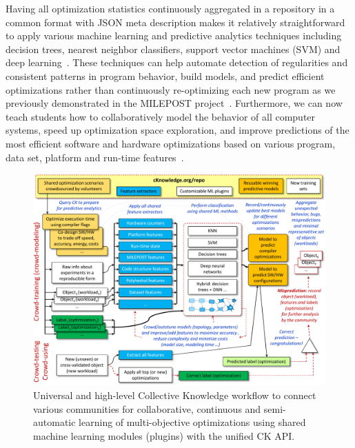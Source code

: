 Having all optimization statistics continuously aggregated in a repository 
in a common format with JSON meta description 
makes it relatively straightforward to apply various machine learning 
and predictive analytics techniques including 
decision trees, nearest neighbor classifiers, support vector machines (SVM)
and deep learning~\cite{citeulike:873540,sammutencyclopedia}.
%
These techniques can help automate detection of regularities and consistent patterns in program behavior,
build models, and predict efficient optimizations rather than
continuously re-optimizing each new program as we previously demonstrated 
in the MILEPOST project~\cite{29db2248aba45e59:a31e374796869125,CFAP2007}.
%
Furthermore, we can now teach students how to collaboratively model 
the behavior of all computer systems, speed up optimization space exploration, 
and improve predictions of the most efficient software and hardware optimizations
based on various program, data set, platform and run-time 
features~\cite{fursin:hal-01054763,cm:29db2248aba45e59:cd11e3a188574d80}.

   \begin{figure}[!htbp]
     \centering
      \includegraphics[width=6.6in]
      {ck-assets/c5d0a4d5514e4c98-cropped.pdf} %
     \caption{
       Universal and high-level Collective Knowledge workflow to connect various communities 
       for collaborative, continuous and semi-automatic learning of multi-objective optimizations
       using shared machine learning modules (plugins) with the unified CK API.
     }
     \label{fig:ck-crowdmodeling}
   \end{figure}

